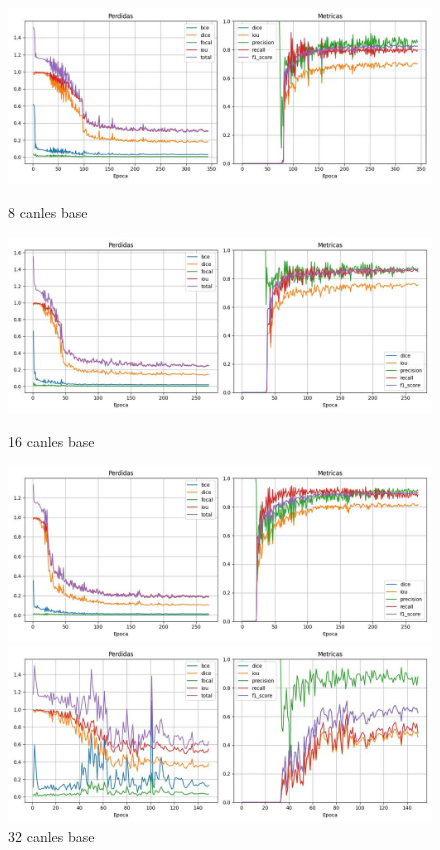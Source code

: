 \documentclass{article}
\begin{document}
\begin{itemize}
\begin{figure}[htbp]
    \centering
    \begin{minipage}{0.32\textwidth}
    \centering
        \includegraphics[width=\linewidth]{figuras/8.jpg}
        \caption*{8 canles base}
    \end{minipage}
    \hfill
    \begin{minipage}{0.32\textwidth}
    \centering
        \includegraphics[width=\linewidth]{figuras/16.jpg}
        \caption*{16 canles base}
    \end{minipage}
    \hfill
    \begin{minipage}{0.32\textwidth}
    \centering
        \includegraphics[width=\linewidth]{figuras/32.jpg}
        \caption*{32 canles base}
    \end{minipage}
    \hfill
    \begin{minipage}{0.48\textwidth}
    \centering
        \includegraphics[width=\linewidth]{figuras/64.jpg}

\end{minipage}
\end{figure}
\end{itemize}
\end{document}
